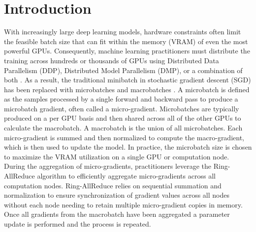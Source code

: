 \section{Introduction}
\label{sec:intro}

With increasingly large deep learning models, hardware constraints often limit the feasible batch size that can fit within the memory (VRAM) of even the most powerful GPUs. Consequently, machine learning practitioners must distribute the training across hundreds or thousands of GPUs using Distributed Data Parallelism (DDP), Distributed Model Parallelism (DMP), or a combination of both \cite{li2020pytorch,dean2012large,shoeybi2019megatron,you2020large,hoffmann2022training}. As a result, the traditional minibatch in stochastic gradient descent (SGD) has been replaced with microbatches and macrobatches \cite{Piao_2023}. A microbatch is defined as the samples processed by a single forward and backward pass to produce a microbatch gradient, often called a micro-gradient. Microbatches are typically produced on a per GPU basis and then shared across all of the other GPUs to calculate the macrobatch. A macrobatch is the union of all microbatches. Each micro-gradient is summed and then normalized to compute the macro-gradient, which is then used to update the model. In practice, the microbatch size is chosen to maximize the VRAM utilization on a single GPU or computation node. During the aggregation of micro-gradients, practitioners leverage the Ring-AllReduce algorithm \cite{baidu2017ringallreduce} to efficiently aggregate micro-gradients across all computation nodes. Ring-AllReduce relies on sequential summation and normalization to ensure synchronization of gradient values across all nodes without each node needing to retain multiple micro-gradient copies in memory. Once all gradients from the macrobatch have been aggregated a parameter update is performed and the process is repeated.

